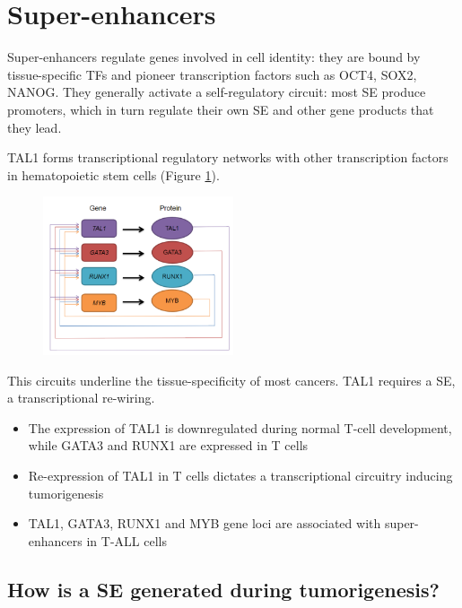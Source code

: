 \hypertarget{super-enhancers}{%
\section{Super-enhancers}\label{super-enhancers}}

Super-enhancers regulate genes involved in cell identity: they are bound by tissue-specific TFs and pioneer transcription factors such as OCT4, SOX2, NANOG. They generally activate a self-regulatory circuit: most SE produce promoters, which in turn regulate their own SE and other gene products that they lead.

TAL1 forms transcriptional regulatory networks with other transcription factors in hematopoietic stem cells (Figure \ref{fig:hema}).

\begin{figure}
\centering
\includegraphics[width=0.5\textwidth]{../_resources/99fbd93b812d482263d53c442698a36a.png}
\caption{}
\label{fig:hema}
\end{figure}


This circuits underline the tissue-specificity of most cancers. TAL1 requires a SE, a transcriptional re-wiring.
\begin{itemize}
\item The expression of TAL1 is downregulated during normal T-cell development, while GATA3 and RUNX1 are expressed in T cells
\item  Re-expression of TAL1 in T cells dictates a transcriptional circuitry inducing tumorigenesis
\item TAL1, GATA3, RUNX1 and MYB gene loci are associated with super-enhancers in T-ALL cells
\end{itemize}

\hypertarget{how-is-a-se-generated-during-tumorigenesis}{%
\subsection{How is a SE generated during tumorigenesis?}\label{how-is-a-se-generated-during-tumorigenesis}}

